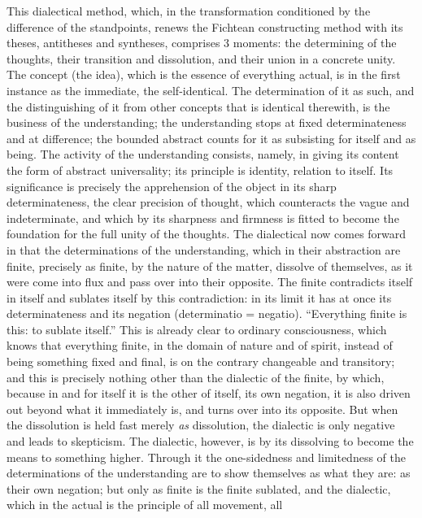 This dialectical method, which, in the transformation conditioned by
the difference of the standpoints, renews the Fichtean
constructing method with its theses, antitheses and
syntheses, comprises 3 moments: the determining of the thoughts, their
transition and dissolution, and their union in a concrete unity. The
concept (the idea), which is the essence of everything actual, is in
the first instance as the immediate, the self-identical. The
determination of it as such, and the distinguishing of it from other
concepts that is identical therewith, is the business of the
understanding; the understanding stops at fixed determinateness and at
difference; the bounded abstract counts for it as subsisting for itself
and as being. The activity of the understanding consists, namely, in
giving its content the form of abstract universality; its principle is
identity, relation to itself. Its significance is precisely the
apprehension of the object in its sharp determinateness, the clear
precision of thought, which counteracts the vague and indeterminate, and
which by its sharpness and firmness is fitted to become the foundation
for the full unity of the thoughts. The dialectical now comes forward in
that the determinations of the understanding, which in their
abstraction are finite, precisely as finite, by the nature of the
matter, dissolve of themselves, as it were come into flux and pass over
into their opposite. The finite contradicts itself in itself and
sublates itself by this contradiction: in its limit it has at once its
determinateness and its negation (determinatio = negatio). ``Everything
finite is this: to sublate itself.'' This is already clear to ordinary
consciousness, which knows that everything finite, in the domain of
nature and of spirit, instead of being something fixed and final, is on
the contrary changeable and transitory; and this is precisely nothing
other than the dialectic of the finite, by which, because in and for
itself it is the other of itself, its own negation, it is also driven
out beyond what it immediately is, and turns over into its opposite.
But when the dissolution is held fast merely \emph{as} dissolution, the
dialectic is only negative and leads to skepticism. The dialectic,
however, is by its dissolving to become the means to something higher.
Through it the one-sidedness and limitedness of the determinations of
the understanding are to show themselves as what they are: as their own
negation;
but only as finite is the finite sublated, and the
dialectic, which in the actual is the principle of all movement, all

